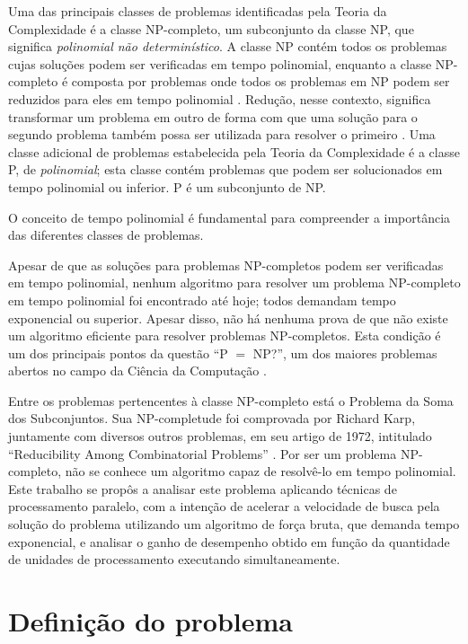 \documentclass[12pt]{article}
\begin{document}
Uma das principais classes de problemas identificadas pela Teoria da Complexidade é a classe NP-completo, um subconjunto da classe NP, que significa \textit{polinomial não determinístico}. A classe NP contém todos os problemas cujas soluções podem ser verificadas em tempo polinomial, enquanto a classe NP-completo é composta por problemas onde todos os problemas em NP podem ser reduzidos para eles em tempo polinomial \cite{Garey1979}. Redução, nesse contexto, significa transformar um problema em outro de forma com que uma solução para o segundo problema também possa ser utilizada para resolver o primeiro \cite{Sipser1996}. Uma classe adicional de problemas estabelecida pela Teoria da Complexidade é a classe P, de \textit{polinomial}; esta classe contém problemas que podem ser solucionados em tempo polinomial ou inferior. P é um subconjunto de NP.

O conceito de tempo polinomial é fundamental para compreender a importância das diferentes classes de problemas. 

Apesar de que as soluções para problemas NP-completos podem ser verificadas em tempo polinomial, nenhum algoritmo para resolver um problema NP-completo em tempo polinomial foi encontrado até hoje; todos demandam tempo exponencial ou superior. Apesar disso, não há nenhuma prova de que não existe um algoritmo eficiente para resolver problemas NP-completos. Esta condição é um dos principais pontos da questão ``P $=$ NP?'', um dos maiores problemas abertos no campo da Ciência da Computação \cite{Sipser1996}.

Entre os problemas pertencentes à classe NP-completo está o Problema da Soma dos Subconjuntos. Sua NP-completude foi comprovada por Richard Karp, juntamente com diversos outros problemas, em seu artigo de 1972, intitulado ``Reducibility Among Combinatorial Problems'' \cite{Karp1972}. Por ser um problema NP-completo, não se conhece um algoritmo capaz de resolvê-lo em tempo polinomial. Este trabalho se propôs a analisar este problema aplicando técnicas de processamento paralelo, com a intenção de acelerar a velocidade de busca pela solução do problema utilizando um algoritmo de força bruta, que demanda tempo exponencial, e analisar o ganho de desempenho obtido em função da quantidade de unidades de processamento executando simultaneamente.

\section{Definição do problema} \label{sec:def}
\end{document}
